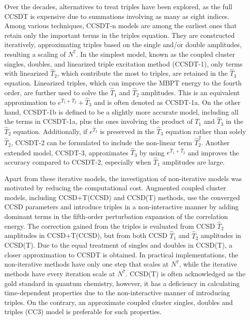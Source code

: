Over the decades, alternatives to treat triples have been explored, as the full CCSDT is expensive due to summations involving as many as eight indices. Among various techniques, CCSDT-n\cite{Noga1987ccsdtn} models are among the earliest ones that retain only the important terms in the triples equation. They are constructed iteratively, approximating triples based on the single and/or double amplitudes, resulting a scaling of $N^{7}$. In the simplest model, known as the coupled cluster singles, doubles, and linearized triple excitation method (CCSDT-1),\cite{Lee1984, Urban1985} only terms with linearized $\hat{T}_{2}$, which contribute the most to triples, are retained in the $\hat{T}_{3}$ equation. Linearized triples, which can improve the MBPT energy to the fourth order, are further used to solve the $\hat{T}_{1}$ and $\hat{T}_{2}$ amplitudes. This is an equivalent approximation to $e^{\hat{T}_{1}+\hat{T}_{2}} + \hat{T}_{3}$ and is often denoted as CCSDT-1a. On the other hand, CCSDT-1b is defined to be a slightly more accurate model, including all the terms in CCSDT-1a, plus the ones involving the product of $\hat{T}_{1}$ and $\hat{T}_{3}$ in the $\hat{T}_{2}$ equation. Additionally, if $e^{\hat{T}_{2}}$ is preserved in the $\hat{T}_{3}$ equation rather than solely $\hat{T}_{2}$, CCSDT-2\cite{Noga1987ccsdtn} can be formulated to include the non-linear term $\hat{T}_{2}^{2}$. Another extended model, CCSDT-3,\cite{Noga1987ccsdtn} approximates $\hat{T}_{3}$ by using $e^{\hat{T}_{1} + \hat{T}_{2}}$ and improves the accuracy compared to CCSDT-2, especially when $\hat{T}_{1}$ amplitudes are large. 

Apart from these iterative models, the investigation of non-iterative models was motivated by reducing the computational cost. Augmented coupled cluster models, including CCSD+T(CCSD)\cite{Urban1985} and CCSD(T)\cite{Raghavachari1989, Stanton1997} methods, use the converged CCSD parameters and introduce triples in a non-interactive manner by adding dominant terms in the fifth-order perturbation expansion of the correlation energy. The correction gained from the triples is evaluated from CCSD $\hat{T}_{2}$ amplitudes in CCSD+T(CCSD), but from both CCSD $\hat{T}_{1}$ and $\hat{T}_{2}$ amplitudes in CCSD(T). Due to the equal treatment of singles and doubles in CCSD(T), a closer approximation to CCSDT is obtained. In practical implementations, the non-iterative methods have only one step that scales at $N^{7}$, while the iterative methods have every iteration scale at $N^{7}$. CCSD(T) is often acknowledged as the gold standard in quantum chemistry, however, it has a deficiency in calculating time-dependent properties due to the non-interactive manner of introducing triples. On the contrary, an approximate coupled cluster singles, doubles and triples (CC3)\cite{Koch1997} model is preferable for such properties. 

